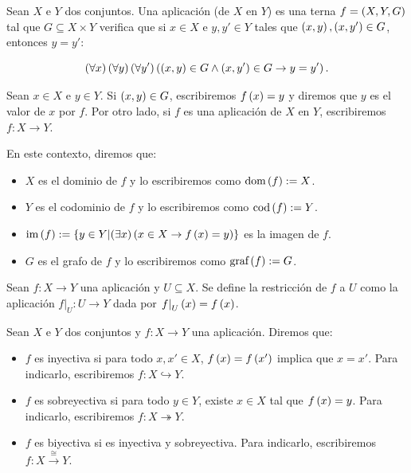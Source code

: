 \begin{definition}
  \rm Sean $X$ e $Y$ dos conjuntos. Una aplicación (de $X$ en $Y$) es una terna $f=\left(X,Y,G\right)$ tal que $G\subseteq X\times Y$ verifica que si $x\in X$ e $y,y'\in Y$ tales que $\left(x,y\right),\left(x,y'\right)\in G$, entonces $y=y'$:

\begin{equation}
    \left(\forall x\right)\left(\forall y\right)\left(\forall y'\right)\left(\left(x,y\right)\in G\land\left(x,y'\right)\in G\rightarrow y=y'\right).
\end{equation}

Sean $x\in X$ e $y\in Y$. Si $\left(x,y\right)\in G$, escribiremos $f\left(x\right)=y$ y diremos que $y$ es el valor de $x$ por $f$. Por otro lado, si $f$ es una aplicación de $X$ en $Y$, escribiremos $f:X\rightarrow Y$. 

En este contexto, diremos que:

\begin{itemize}
    \item $X$ es el dominio de $f$ y lo escribiremos como $\text{dom}\left(f\right):=X$.
    \item $Y$ es el codominio de $f$ y lo escribiremos como $\text{cod}\left(f\right):=Y$.
    \item $\text{im}\left(f\right):=\left\{y\in Y\middle|\left(\exists x\right)\left(x\in X\rightarrow f\left(x\right)=y\right)\right\}$ es la imagen de $f$. 
    \item $G$ es el grafo de $f$ y lo escribiremos como $\text{graf}\left(f\right):=G$.
\end{itemize}
\end{definition}

\begin{definition}
  \rm Sean $f:X\rightarrow Y$ una aplicación y $U\subseteq X$. Se define la restricción de $f$ a $U$ como la aplicación $\left.f\right|_U:U\rightarrow Y$ dada por $\left.f\right|_U\left(x\right)=f\left(x\right)$.
\end{definition}


\begin{definition}
  \rm Sean $X$ e $Y$ dos conjuntos y $f:X\rightarrow Y$ una aplicación. Diremos que:

\begin{itemize}
    \item $f$ es inyectiva si para todo $x,x'\in X$, $f\left(x\right)=f\left(x'\right)$ implica que $x=x'$. Para indicarlo, escribiremos $f:X\hookrightarrow Y$.
    \item $f$ es sobreyectiva si para todo $y\in Y$, existe $x\in X$ tal que $f\left(x\right)=y$. Para indicarlo, escribiremos $f:X\twoheadrightarrow Y$.
    \item $f$ es biyectiva si es inyectiva y sobreyectiva. Para indicarlo, escribiremos $f:X\xrightarrow{\cong}Y$.
\end{itemize}
\end{definition}


